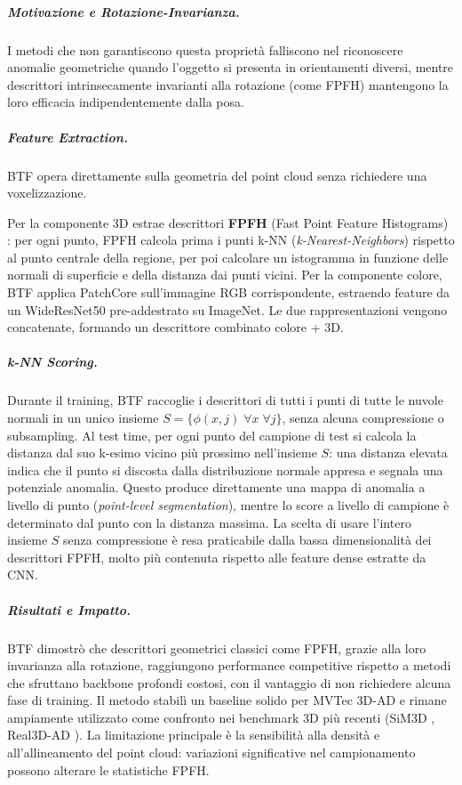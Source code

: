 \subparagraph{Motivazione e Rotazione-Invarianza.}
I metodi che non garantiscono questa proprietà falliscono nel riconoscere anomalie geometriche quando l'og\-get\-to si presenta in orientamenti diversi, mentre descrittori intrinsecamente invarianti alla rotazione (come FPFH) mantengono la loro efficacia indipendentemente dalla posa.
 

\subparagraph{Feature Extraction.}
BTF opera direttamente sulla geometria del point cloud senza richiedere una voxelizzazione. 

Per la componente 3D estrae descrittori \textbf{FPFH} (Fast Point Feature Histograms) \cite{rusu2009fast}: per ogni punto, FPFH calcola  prima i punti k-NN (\textit{k-Nearest-Neighbors}) rispetto al punto centrale della regione, per poi calcolare un istogramma in funzione delle normali di superficie e della distanza dai punti vicini. Per la componente colore, BTF applica PatchCore sull'immagine RGB corrispondente, estraendo feature da un WideResNet50 pre-addestrato su ImageNet. Le due rappresentazioni vengono concatenate, formando un descrittore combinato colore + 3D.


\subparagraph{k-NN Scoring.}
Durante il training, BTF raccoglie i descrittori di tutti i punti di tutte le nuvole normali in un unico insieme $S = \{\phi(x, j) \; \forall x \; \forall j\}$, senza alcuna compressione o subsampling. Al test time, per ogni punto del campione di test si calcola la distanza dal suo k-esimo vicino più prossimo nell'insieme $S$: una distanza elevata indica che il punto si discosta dalla distribuzione normale appresa e segnala una potenziale anomalia. Questo produce direttamente una mappa di anomalia a livello di punto (\textit{point-level segmentation}), mentre lo score a livello di campione è determinato dal punto con la distanza massima. La scelta di usare l'intero insieme $S$ senza compressione è resa praticabile dalla bassa dimensionalità dei descrittori FPFH, molto più contenuta rispetto alle feature dense estratte da CNN.


\subparagraph{Risultati e Impatto.}
BTF dimostrò che descrittori geometrici classici come FPFH, grazie alla loro invarianza alla rotazione, raggiungono performance competitive rispetto a metodi che sfruttano backbone profondi costosi, con il vantaggio di non richiedere alcuna fase di training.
Il metodo stabilì un baseline solido per MVTec 3D-AD e rimane ampiamente utilizzato come confronto nei benchmark 3D più recenti (SiM3D \cite{sim3d2025}, Real3D-AD \cite{liu2023real3dad}).
La limitazione principale è la sensibilità alla densità e all'allineamento del point cloud: variazioni significative nel campionamento possono alterare le statistiche FPFH.

